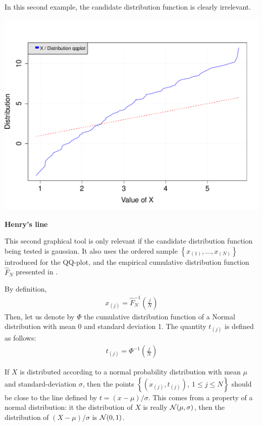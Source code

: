 {  In this second example, the candidate distribution function is clearly irrelevant.

  \begin{center}
    \includegraphics[scale=0.6]{Figures/QQplotDistribBad.pdf}
  \end{center}


  \textbf{Henry's line}

  This second graphical tool is only relevant if the candidate distribution function being tested is gaussian. It also uses the ordered sample $\left\{ x_{(1)},\ldots,x_{(N)} \right\}$ introduced for the QQ-plot, and the empirical cumulative distribution function $\widehat{F}_N$ presented in .

  By definition,
  \begin{align*}
    x_{(j)} = \widehat{F}_N^{-1} \left( \frac{j}{N} \right)
  \end{align*}
  Then, let us denote by $\Phi$ the cumulative distribution function of a Normal distribution with mean 0 and standard deviation 1. The quantity $t_{(j)}$ is defined as follows:
  \begin{align*}
    t_{(j)} = \Phi^{-1} \left( \frac{j}{N} \right)
  \end{align*}

  If $X$ is distributed according to a normal probability distribution with mean $\mu$ and standard-deviation $\sigma$, then the points $\left\{ \left( x_{(j)},t_{(j)} \right),\ 1 \leq j \leq N \right\}$ should be close to the line defined by $t = (x-\mu) / \sigma$. This comes from a property of a normal distribution: it the distribution of $X$ is really ${\mathcal N}(\mu,\sigma)$, then the distribution of $(X-\mu) / \sigma$ is ${\mathcal N}(0,1)$.

}
